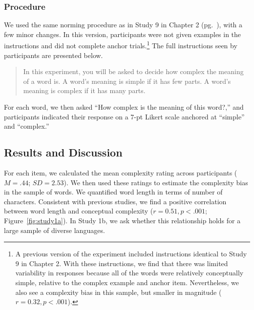 \subsubsection{Procedure}
We used the same norming procedure as in Study 9 in Chapter 2 (pg.\ \pageref{ch2-9}), with a few minor changes. In this version, participants were not given examples in the instructions and did not complete anchor trials.\footnote{A previous version of the experiment included instructions identical to Study 9 in Chapter 2. With these instructions, we find that there was limited variability in responses because all of the words were relatively conceptually simple, relative to the complex example and anchor item. Nevertheless, we also see a complexity bias in this sample, but smaller in magnitude ($r=0.32, p<.001$).} The full instructions seen by participants are presented below.  
\begin{quote}
In this experiment, you will be asked to decide how complex the meaning of a word is. A word's meaning is simple if it has few parts. A word's meaning is complex if it has many parts.
\end{quote}
For each word, we then asked ``How complex is the meaning of this word?,'' and participants indicated their response on a 7-pt Likert scale anchored at ``simple'' and ``complex.''

\subsection{Results and Discussion}
For each item, we calculated the mean complexity rating across participants ($M = .44$; $SD = 2.53$). We then used these ratings to estimate the complexity bias in the sample of words. We quantified word length in terms of number of characters. Consistent with previous studies, we find a positive correlation between word length and conceptual complexity ($r=0.51, p<.001$; Figure\ \ref{fig:study1a}). In Study 1b, we ask whether this relationship holds for a large sample of diverse languages.

